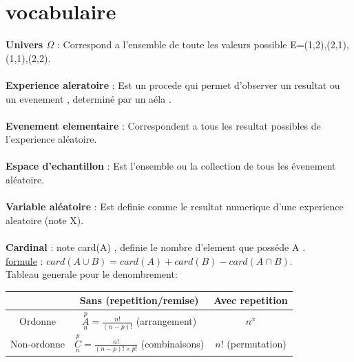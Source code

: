 \documentclass[a4paper,8pt,openany]{book}
\begin{document}
\section{vocabulaire}

\textbf{Univers $\Omega$ } : Correspond a l'ensemble de toute les valeurs possible E={(1,2),(2,1),(1,1),(2,2)}.\\
\\
\textbf{Experience aleratoire} : Est un procede qui permet d'observer un resultat ou un evenement , determiné par un aéla .\\
\\
\textbf{Evenement elementaire} : Correspondent a tous les resultat possibles de l'experience aléatoire.\\
\\
\textbf{Espace d'echantillon} : Est l'ensemble ou la collection de tous les évenement aléatoire.\\
\\
\textbf{Variable aléatoire} : Est definie comme le resultat numerique d'une experience aleatoire (note X).\\
\\
\textbf{Cardinal} : note card(A) , definie le nombre d'element que posséde A .\\
\underline{formule} : $card(A\cup B) = card(A)+card(B)-card(A\cap B)$.\\

Tableau generale pour le denombrement:\\

\begin{center}
\begin{tabular}{|c|c|c|}
\hline
   & Sans (repetition/remise) & Avec repetition \\ \hline
Ordonne & $A\limits_n^p = \frac{n!}{(n-p)!}$ (arrangement) & $n^x $\\ \hline
Non-ordonne & $C\limits_n^p = \frac{n!}{(n-p)!\times p!}$ (combinaisons) & $n!$ (permutation) \\ \hline 
\end{tabular}
\end{center}
\\
\end{document}
